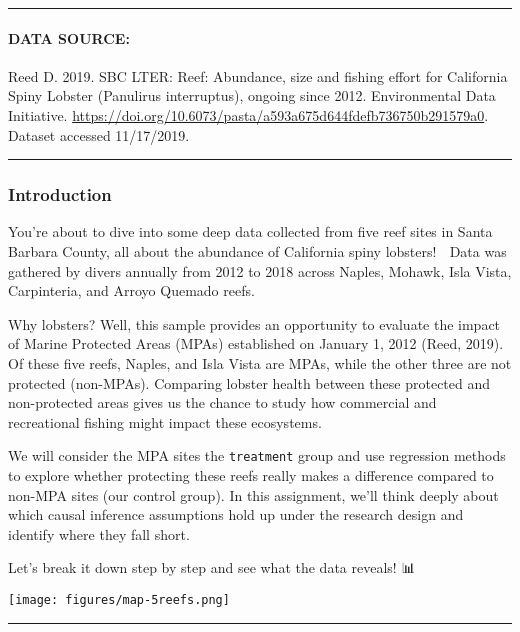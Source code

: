 \documentclass[
]{article}
\begin{document}
\begin{center}\rule{0.5\linewidth}{0.5pt}\end{center}

\paragraph{DATA SOURCE:}\label{data-source}

Reed D. 2019. SBC LTER: Reef: Abundance, size and fishing effort for
California Spiny Lobster (Panulirus interruptus), ongoing since 2012.
Environmental Data Initiative.
\url{https://doi.org/10.6073/pasta/a593a675d644fdefb736750b291579a0}.
Dataset accessed 11/17/2019.

\begin{center}\rule{0.5\linewidth}{0.5pt}\end{center}

\subsubsection{\texorpdfstring{\textbf{Introduction}}{Introduction}}\label{introduction}

You're about to dive into some deep data collected from five reef sites
in Santa Barbara County, all about the abundance of California spiny
lobsters! 🦞 Data was gathered by divers annually from 2012 to 2018
across Naples, Mohawk, Isla Vista, Carpinteria, and Arroyo Quemado
reefs.

Why lobsters? Well, this sample provides an opportunity to evaluate the
impact of Marine Protected Areas (MPAs) established on January 1, 2012
(Reed, 2019). Of these five reefs, Naples, and Isla Vista are MPAs,
while the other three are not protected (non-MPAs). Comparing lobster
health between these protected and non-protected areas gives us the
chance to study how commercial and recreational fishing might impact
these ecosystems.

We will consider the MPA sites the \texttt{treatment} group and use
regression methods to explore whether protecting these reefs really
makes a difference compared to non-MPA sites (our control group). In
this assignment, we'll think deeply about which causal inference
assumptions hold up under the research design and identify where they
fall short.

Let's break it down step by step and see what the data reveals! 📊

\texttt{[image: figures/map-5reefs.png]}

\begin{center}\rule{0.5\linewidth}{0.5pt}\end{center}
\end{document}
